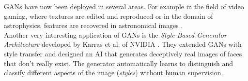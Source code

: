 GANs have now been deployed in several areas. For example in the field of video gaming, where textures are edited and reproduced \cite{resolutionGANWang2018Sep} or in the domain of astrophysics, features are recovered in astronomical images \cite{astroGANSchawinski2017Feb}.\\
Another very interesting application of GANs is the \textit{Style-Based Generator Architecture} developed by Karras et al. of NVIDIA \cite{nvidiaThisPersonDoesNotExistKarras2018Dec}. They extended GANs with style transfer and designed an AI that generates deceptively real images of faces that don't really exist. The generator automatically learns to distinguish and classify different aspects of the image (\textit{styles}) without human supervision. 
